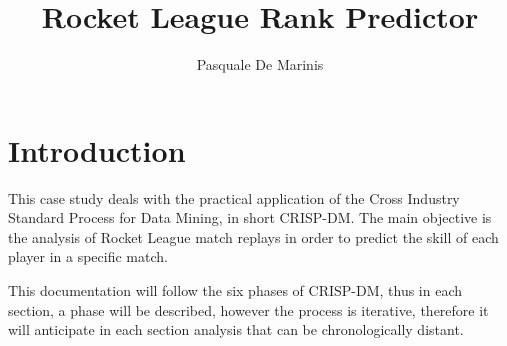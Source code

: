 \documentclass[
	12pt, %
]{fphw}
\title{Rocket League Rank Predictor}
\author{Pasquale De Marinis}
\institute{University of Bari \\ Department of Computer Science} %
\begin{document}
\maketitle
\tableofcontents\newpage

\section{Introduction}

This case study deals with the practical application of the Cross Industry Standard Process for Data Mining, in short CRISP-DM. The main objective is the analysis of Rocket League match replays in order to predict the skill of each player in a specific match.

This documentation will follow the six phases of CRISP-DM, thus in each section, a phase will be described, however the process is iterative, therefore it will anticipate in each section analysis that can be chronologically distant.




\end{document}
